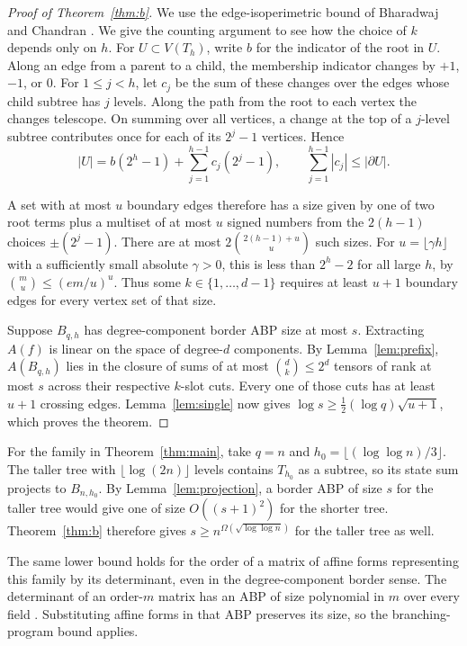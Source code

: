 \begin{proof}[Proof of Theorem~\ref{thm:b}]
We use the edge-isoperimetric bound of Bharadwaj and Chandran
\cite[Theorem~1 and Corollary~1]{BharadwajChandran}. We give the
counting argument to see how the choice of $k$ depends only on $h$.
For $U\subset V(T_h)$, write $b$ for the indicator of the root in
$U$. Along an edge from a parent to a child, the membership indicator
changes by $+1$, $-1$, or $0$. For $1\le j<h$, let $c_j$ be the sum
of these changes over the edges whose child subtree has $j$ levels.
Along the path from the root to each vertex the changes telescope.
On summing over all vertices, a change at the top of a $j$-level
subtree contributes once for each of its $2^j-1$ vertices. Hence
\begin{equation}\label{eq:tree-sizes}
 |U|=b(2^h-1)+\sum_{j=1}^{h-1} c_j(2^j-1),
 \qquad \sum_{j=1}^{h-1}|c_j|\le|\partial U|.
\end{equation}

A set with at most $u$ boundary edges therefore has a size given by
one of two root terms plus a multiset of at most $u$ signed numbers
from the $2(h-1)$ choices $\pm(2^j-1)$. There are at most
$2\binom{2(h-1)+u}{u}$ such sizes. For $u=\lfloor\gamma h\rfloor$
with a sufficiently small absolute $\gamma>0$, this is less than
$2^h-2$ for all large $h$, by $\binom{m}{u}\le(em/u)^u$.
Thus some $k\in\{1,\ldots,d-1\}$ requires at least $u+1$ boundary
edges for every vertex set of that size.

Suppose $B_{q,h}$ has degree-component border ABP size at most $s$.
Extracting $A(f)$ is linear on the space of degree-$d$ components.
By Lemma~\ref{lem:prefix}, $A(B_{q,h})$ lies in the closure of sums
of at most $\binom{d}{k}\le 2^d$ tensors of rank at most $s$ across
their respective $k$-slot cuts. Every one of those cuts has at least
$u+1$ crossing edges. Lemma~\ref{lem:single} now gives
$\log s\ge\tfrac12(\log q)\sqrt{u+1}$, which proves the theorem.
\end{proof}

For the family in Theorem~\ref{thm:main}, take $q=n$ and
$h_0=\lfloor(\log\log n)/3\rfloor$. The taller tree with
$\lfloor\log(2n)\rfloor$ levels contains $T_{h_0}$ as a subtree,
so its state sum projects to $B_{n,h_0}$. By Lemma~\ref{lem:projection},
a border ABP of size $s$ for the taller tree would give one of size
$O((s+1)^2)$ for the shorter tree. Theorem~\ref{thm:b} therefore
gives $s\ge n^{\Omega(\sqrt{\log\log n})}$ for the taller tree as well.

The same lower bound holds for the order of a matrix of affine forms
representing this family by its determinant, even in the
degree-component border sense. The determinant of an order-$m$ matrix
has an ABP of size polynomial in $m$ over every field
\cite{MahajanVinay,MalodPortier}. Substituting affine forms in that ABP
preserves its size, so the branching-program bound applies.

